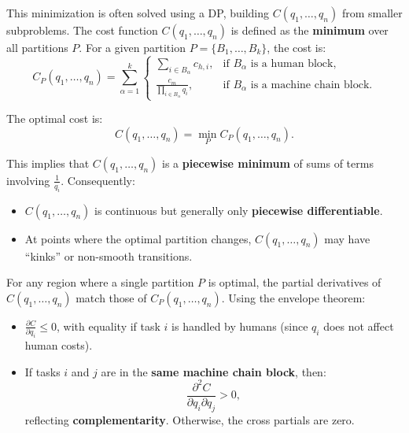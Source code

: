 \documentclass{article}
\begin{document}
This minimization is often solved using a DP, building \(C(q_1, \dots, q_n)\) from smaller subproblems.
The cost function \(C(q_1, \dots, q_n)\) is defined as the \textbf{minimum} over all partitions \(P\). For a given partition \(P = \{B_1, \dots, B_k\}\), the cost is:
\[
C_P(q_1, \dots, q_n) = \sum_{\alpha=1}^k
\begin{cases}
\sum_{i \in B_\alpha} c_{h,i}, & \text{if } B_\alpha \text{ is a human block}, \\[6pt]
\frac{c_m}{\prod_{i \in B_\alpha} q_i}, & \text{if } B_\alpha \text{ is a machine chain block}.
\end{cases}
\]

The optimal cost is:
\[
C(q_1, \dots, q_n) = \min_{P} C_P(q_1, \dots, q_n).
\]

This implies that \(C(q_1, \dots, q_n)\) is a \textbf{piecewise minimum} of sums of terms involving \(\frac{1}{q_i}\). Consequently:
\begin{itemize}
    \item \(C(q_1, \dots, q_n)\) is continuous but generally only \textbf{piecewise differentiable}.
    \item At points where the optimal partition changes, \(C(q_1, \dots, q_n)\) may have “kinks” or non-smooth transitions.
\end{itemize}

For any region where a single partition \(P\) is optimal, the partial derivatives of \(C(q_1, \dots, q_n)\) match those of \(C_P(q_1, \dots, q_n)\). Using the envelope theorem:
\begin{itemize}
    \item \(\frac{\partial C}{\partial q_i} \leq 0\), with equality if task \(i\) is handled by humans (since \(q_i\) does not affect human costs).
    \item If tasks \(i\) and \(j\) are in the \textbf{same machine chain block}, then:
    \[
    \frac{\partial^2 C}{\partial q_i \partial q_j} > 0,
    \]
    reflecting \textbf{complementarity}. Otherwise, the cross partials are zero.
\end{itemize}
\end{document}
